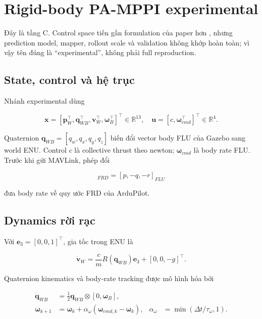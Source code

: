 \documentclass[11pt,a4paper]{article}
\newcommand{\R}{\mathbb{R}}
\newcommand{\vect}[1]{\bm{#1}}
\begin{document}
\section{Rigid-body PA-MPPI experimental}

Đây là tầng C. Control space tiến gần formulation của paper hơn
\cite{zhai2026pamppi}, nhưng prediction model, mapper, rollout scale và validation
không khớp hoàn toàn; vì vậy tên đúng là ``experimental'', không phải full
reproduction.

\subsection{State, control và hệ trục}

Nhánh experimental dùng

\begin{equation}
\vect x=[\vect p_W^\top,\vect q_{WB}^\top,\vect v_W^\top,
\vect\omega_B^\top]^\top\in\R^{13},
\quad
\vect u=[c,\vect\omega_{cmd}^\top]^\top\in\R^4.
\end{equation}

Quaternion $\vect q_{WB}=[q_w,q_x,q_y,q_z]$ biến đổi vector body FLU của
Gazebo sang world ENU. Control $c$ là collective thrust theo newton;
$\vect\omega_{cmd}$ là body rate FLU. Trước khi gửi MAVLink, phép đổi

\begin{equation}
[p,q,r]_{FRD}=[p,-q,-r]_{FLU}
\end{equation}

đưa body rate về quy ước FRD của ArduPilot.

\subsection{Dynamics rời rạc}

Với $\vect e_3=[0,0,1]^\top$, gia tốc trong ENU là

\begin{equation}
\dot{\vect v}_W = \frac{c}{m}R(\vect q_{WB})\vect e_3
+[0,0,-g]^\top.
\end{equation}

Quaternion kinematics và body-rate tracking được mô hình hóa bởi

\begin{align}
\dot{\vect q}_{WB} &= \frac{1}{2}\vect q_{WB}\otimes[0,\vect\omega_B],\\
\vect\omega_{k+1} &= \vect\omega_k+
\alpha_\omega(\vect\omega_{cmd,k}-\vect\omega_k),
&\alpha_\omega&=\min(\Delta t/\tau_\omega,1).
\end{align}
\end{document}
